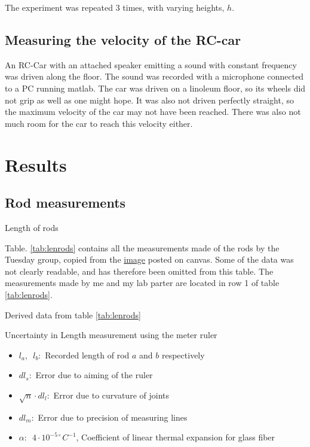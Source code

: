 \documentclass[11pt,a4paper]{article}
\begin{document}
    The experiment was repeated 3 times, with varying heights, $h$.
  
  \subsection{Measuring the velocity of the RC-car}
    An RC-Car with an attached speaker emitting a sound with constant frequency was driven along the floor. The sound was recorded with a microphone connected to a PC running matlab. The car was driven on a linoleum floor, so its wheels did not grip as well as one might hope. It was also not driven perfectly straight, so the maximum velocity of the car may not have been reached. There was also not much room for the car to reach this velocity either.


\section{\label{sec:data} Results}

  \subsection{Rod measurements}
    \begin{table}[H]
      \center
      \caption{Length of rods}
      \label{tab:lenrods}
      
    \end{table}
    Table. \ref{tab:lenrods} contains all the measurements made of the rods by the Tuesday group, copied from the \href{https://uio.instructure.com/courses/910/modules/items/13592}{image} posted on canvas. Some of the data was not clearly readable, and has therefore been omitted from this table. The measurements made by me and my lab parter are located in row 1 of table \ref{tab:lenrods}.

    \begin{table}[H]
      \center
      \caption{Derived data from table \ref{tab:lenrods}}
      
      \label{tab:lenrods2}
    \end{table}

    \begin{table}[H]
      \center
      \caption{Uncertainty in Length measurement using the meter ruler}
      \label{tab:uncert}
      
    \end{table}
    
    \begin{itemize}
      \item $l_a, \enspace l_b:$ Recorded length of rod $a$ and $b$ respectively
      \item $dl_s:$ Error due to aiming of the ruler
      \item $\sqrt n \cdot dl_l:$ Error due to curvature of joints
      \item $dl_m:$ Error due to precision of measuring lines
      \item $\alpha :\enspace 4\cdot10^{-5\circ} C^{-1}$, Coefficient of linear thermal expansion for glass fiber
    \end{itemize}
\end{document}
